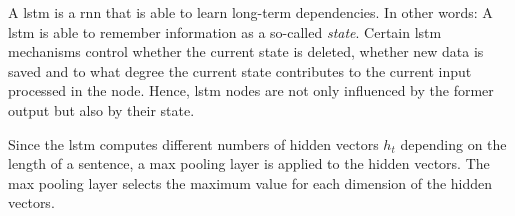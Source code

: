 A \ac{lstm} is a \ac{rnn} that is able to learn long-term dependencies.
In other words: 
A \ac{lstm} is able to remember information as a so-called \textit{state}.
Certain \ac{lstm} mechanisms control whether the current state is deleted, whether new data is saved and 
to what degree the current state contributes to the current input processed in the node.
Hence, \ac{lstm} nodes are not only influenced by the former output but also by their state.

Since the \ac{lstm} computes different numbers of hidden vectors $h_t$ depending on the length of a sentence, a max pooling layer is applied to the hidden vectors.
The max pooling layer selects the maximum value for each dimension of the hidden vectors.







